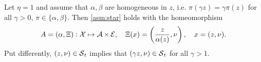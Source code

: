 \begin{proposition}
\label{prop:star}
Let $\eta =1$ and assume that $\alpha,\beta$ are homogeneous in $z$, i.e. $\pi(\gamma z)=\gamma \pi(z)$  for all $\gamma>0$,  $\pi \in \{\alpha,\beta\}$. Then \cref{asm:star} holds with the homeomorphism
\begin{equation}\label{eq:homeo}
A=(\alpha,\Xi): \operatorname{\mathcal{X}}  \mapsto \operatorname{\mathcal{A}} \times \operatorname{\mathcal{E}}, \quad 
\Xi(x) = \left(\frac{z}{\alpha(z)},\nu\right), \quad x = (z,\nu). 
\end{equation}
 Put differently,  $(z,\nu)\in \operatorname{\mathcal{S}}_t$ implies that $(\gamma z,\nu) \in \operatorname{\mathcal{S}}_t$ for all $\gamma > 1$.
\end{proposition} 
